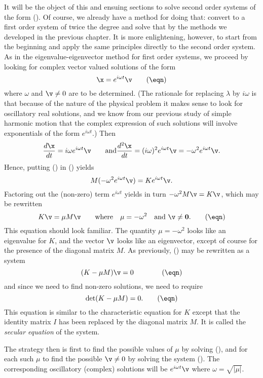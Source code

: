 It will be the object of this and ensuing sections to solve second
order systems of the form (\eqn).   Of course, we already have
a method for doing that: convert to a first order system of twice
the degree and solve that by the methods we developed in the
previous chapter.   It is more enlightening, however, to start
from the beginning and apply the same principles directly to
the second order system.  As in the eigenvalue-eigenvector method
for first order systems, we proceed by looking for complex
vector valued solutions of
the form
\nexteqn
$$
\x = e^{i\omega t}\v\tag\eqn
$$
where $\omega$ and $\v\not= 0$ are to be determined.   (The rationale for
replacing $\lambda$ by $i\omega$ is that because of the nature of
the physical problem it makes sense to look for oscillatory
real solutions, and we know from our previous study of simple harmonic
motion that the complex expression of such solutions will involve
exponentials of the form $e^{i\omega t}$.)   Then
$$
\frac{d\x}{dt} = i\omega e^{i\omega t}\v\qquad\text{and}
\frac{d^2\x}{dt} = (i\omega)^2e^{i\omega t}\v = -\omega^2e^{i\omega t}\v.
$$
Hence,
 putting (\eqn) in (\Prob) yields
$$
M( -\omega^2e^{i\omega t}\v) =  Ke^{i\omega t}\v.
$$
Factoring out the (non-zero) term $e^{i\omega t}$
yields in turn $-\omega^2M\v = K\v$, which may be rewritten
\nexteqn
$$
K\v = \mu M\v\qquad\text{where}\quad \mu = -\omega^2\quad\text{and }
 \v \not= \bold 0. \tag\eqn
$$
This equation should look familiar.
 The quantity
$\mu = -\omega^2$ looks like an eigenvalue for $K$, and the
vector $\v$ looks like an eigenvector, except of course
for the presence of the diagonal matrix $M$.  As previously, (\eqn) may
be rewritten as a system
\nexteqn
\xdef\EqnC{\eqn}
$$
(K -\mu M)\v = 0\qquad\tag\eqn
$$
and since we need to find non-zero solutions, we need to
require
\nexteqn
$$
\det(K - \mu M) = 0.\tag\eqn
$$
This equation is similar to the characteristic equation for
$K$ except that the identity matrix $I$ has been replaced
by the diagonal matrix $M$.
It is called the {\it secular equation\/} of the system.
%

The strategy then is first to find the possible values of
$\mu$ by solving (\eqn), and for each such $\mu$ to find
the possible $\v\not=0$ by solving the system (\EqnC).
The corresponding oscillatory (complex) solutions will be
$e^{i\omega t}\v$ where
$\omega = \sqrt{|\mu|}$. 

